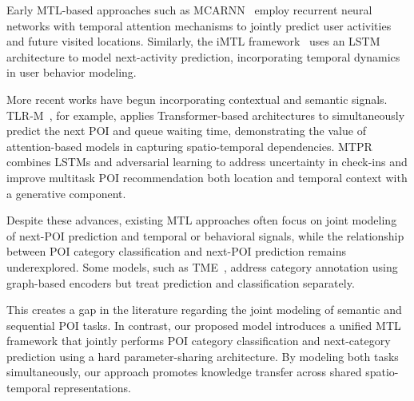 Early MTL-based approaches such as MCARNN~\cite{Liao2018} employ recurrent neural networks with temporal attention mechanisms to jointly predict user activities and future visited locations. Similarly, the iMTL framework~\cite{Zhang2020} uses an LSTM architecture to model next-activity prediction, incorporating temporal dynamics in user behavior modeling.

More recent works have begun incorporating contextual and semantic signals. TLR-M~\cite{Halder2021}, for example, applies Transformer-based architectures to simultaneously predict the next POI and queue waiting time, demonstrating the value of attention-based models in capturing spatio-temporal dependencies. MTPR~\cite{Xia2020} combines LSTMs and adversarial learning to address uncertainty in check-ins and improve multitask POI recommendation both location and temporal context with a generative component.

Despite these advances, existing MTL approaches often focus on joint modeling of next-POI prediction and temporal or behavioral signals, while the relationship between POI category classification and next-POI prediction remains underexplored. Some models, such as TME~\cite{Xu2023}, address category annotation using graph-based encoders but treat prediction and classification separately.

This creates a gap in the literature regarding the joint modeling of semantic and sequential POI tasks. In contrast, our proposed model introduces a unified MTL framework that jointly performs POI category classification and next-category prediction using a hard parameter-sharing architecture. By modeling both tasks simultaneously, our approach promotes knowledge transfer across shared spatio-temporal representations.
